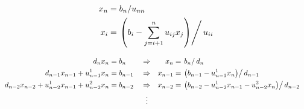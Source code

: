 \documentclass[11pt]{article}
\begin{document}

\begin{align}
    x_{n} &= b_{n} / u_{n n} \\
    x_{i} &= \left.\left(b_{i}-\sum_{j=i+1}^{n} u_{i j} x_{j}\right) \right/ u_{i i}
\end{align}

\begin{align}
    d_{n} x_{n} &= b_{n} & 
        &\Rightarrow &
        x_{n} &= \left. b_{n} \right/ d_{n} \\
    d_{n-1} x_{n-1}+u_{n-1}^{1} x_{n} &= b_{n-1} &
        &\Rightarrow &
        x_{n-1} &= \left.\left(b_{n-1}-u_{n-1}^{1} x_{n}\right) \right/ d_{n-1} \\
    d_{n-2} x_{n-2}+u_{n-2}^{1} x_{n-1}+u_{n-2}^{2} x_{n} &= b_{n-2} &
        &\Rightarrow &
        x_{n-2} &= \left.\left(b_{n-2}-u_{n-2}^{1} x_{n-1}-u_{n-2}^{2} x_{n}\right) \right/ d_{n-2} \\
    & &
        &\ \ \vdots &
    & &
\end{align}
\end{document}
